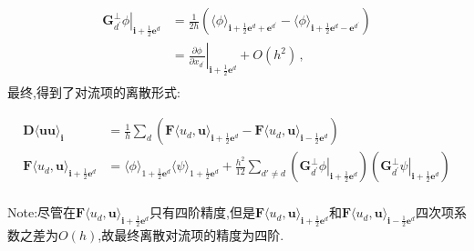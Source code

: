 \documentclass[12pt,halfline,a4paper]{ouparticle}
\begin{document}
$$
\begin{aligned} {{\left. \mathbf{G}_{d^{\prime}}^{\perp} \phi\right|_{\mathbf{i}+\frac{1} {2} \mathbf{e}^{d}}}} & {{} {{}=\frac{1} {2 h} \left( \langle\phi\rangle_{\mathbf{i}+\frac{1} {2} \mathbf{e}^{d}+\mathbf{e}^{d^{\prime}}}-\langle\phi\rangle_{\mathbf{i}+\frac{1} {2} \mathbf{e}^{d}-\mathbf{e}^{d^{\prime}}} \right)}} \\ {{}} & {{} {{}=\left. \frac{\partial\phi} {\partial x_{d^{\prime}}} \right|_{\mathbf{i}+\frac{1} {2} \mathbf{e}^{d}}+O ( h^{2} ) \,,}} \\ \end{aligned} 
$$
最终,得到了对流项的离散形式:

\begin{equation}
    \begin{aligned}
        \mathbf{D} \langle\mathbf{u} \mathbf{u} \rangle_{\mathbf{i}} &=\frac{1} {h} \sum_{d} \left( \mathbf{F} \langle u_{d}, \mathbf{u} \rangle_{\mathbf{i}+\frac{1} {2} \mathbf{e}^{d}}-\mathbf{F} \langle u_{d}, \mathbf{u} \rangle_{\mathbf{i}-\frac{1} {2} \mathbf{e}^{d}} \right)  \\
        \mathbf{F} \langle u_{d}, \mathbf{u} \rangle_{\mathbf{i}+\frac{1} {2} \mathbf{e}^{d}} &=   \langle\phi\rangle_{1+\frac{1}{2} \mathbf{e}^{d}} \langle\psi\rangle_{1+\frac{1} {2} \mathbf{e}^{d}} +\frac{h^{2}} {1 2}\sum_{d'\neq d}( {{\left. \mathbf{G}_{d^{\prime}}^{\perp} \phi\right|_{\mathbf{i}+\frac{1} {2} \mathbf{e}^{d}}}}) ({{\left. \mathbf{G}_{d^{\prime}}^{\perp} \psi\right|_{\mathbf{i}+\frac{1} {2} \mathbf{e}^{d}}}})\\
    \end{aligned}
\end{equation}

Note:尽管在$\mathbf{F} \langle u_{d}, \mathbf{u} \rangle_{\mathbf{i}+\frac{1} {2} \mathbf{e}^{d}}$只有四阶精度,但是$\mathbf{F} \langle u_{d}, \mathbf{u} \rangle_{\mathbf{i}+\frac{1} {2} \mathbf{e}^{d}}$和$\mathbf{F} \langle u_{d}, \mathbf{u} \rangle_{\mathbf{i}-\frac{1} {2} \mathbf{e}^{d}}$四次项系数之差为$O(h)$,故最终离散对流项的精度为四阶.
\end{document}

